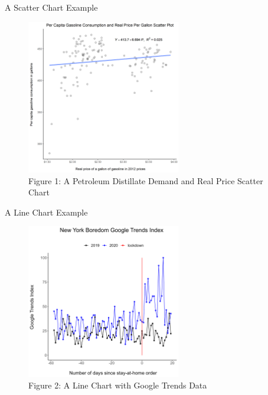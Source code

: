 \documentclass[pdf]{beamer}
\theoremstyle{remark}
\theoremstyle{definition}
\begin{document}
\begin{frame}[t]{A Scatter Chart Example}
\begin{figure}[htbp]
  \centering
  \captionsetup{justification=centering}
  \includegraphics[clip, trim=0cm 0cm 0cm 0cm, width=0.6\textwidth]{Images/a1_q1c.png}
  \caption{Figure {\color{franklinblue} 1}: A Petroleum Distillate Demand and Real Price Scatter Chart}  
  \label{fig:scatterchart}
\end{figure}
\end{frame}

\begin{frame}[t]{A Line Chart Example}
\begin{figure}[htbp]
  \centering
  \captionsetup{justification=centering}
  \includegraphics[clip, trim=0cm 0cm 0cm 0cm, width=0.6\textwidth]{Images/a6_q1_New Yorkboredom.png}
  \caption{Figure {\color{franklinblue} 2}: A Line Chart with Google Trends Data}
  \label{fig:linechart}
\end{figure}
\end{frame}
\end{document}
